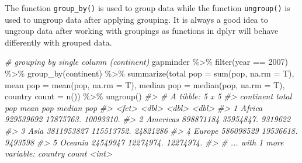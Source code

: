 \documentclass[
]{book}
\newenvironment{Shaded}{\begin{snugshade}}{\end{snugshade}}
\newcommand{\AttributeTok}[1]{\textcolor[rgb]{0.77,0.63,0.00}{#1}}
\newcommand{\CommentTok}[1]{\textcolor[rgb]{0.56,0.35,0.01}{\textit{#1}}}
\newcommand{\DecValTok}[1]{\textcolor[rgb]{0.00,0.00,0.81}{#1}}
\newcommand{\FunctionTok}[1]{\textcolor[rgb]{0.00,0.00,0.00}{#1}}
\newcommand{\NormalTok}[1]{#1}
\newcommand{\OtherTok}[1]{\textcolor[rgb]{0.56,0.35,0.01}{#1}}
\newcommand{\SpecialCharTok}[1]{\textcolor[rgb]{0.00,0.00,0.00}{#1}}
\newcommand{\StringTok}[1]{\textcolor[rgb]{0.31,0.60,0.02}{#1}}
\begin{document}
The function \texttt{group\_by()} is used to group data while the function \texttt{ungroup()} is used to ungroup data after applying grouping. It is always a good idea to ungroup data after working with groupings as functions in dplyr will behave differently with grouped data.

\begin{Shaded}
\begin{Highlighting}[]
\CommentTok{\# grouping by single column (continent)}
\NormalTok{gapminder }\SpecialCharTok{\%\textgreater{}\%}
  \FunctionTok{filter}\NormalTok{(year }\SpecialCharTok{==} \DecValTok{2007}\NormalTok{) }\SpecialCharTok{\%\textgreater{}\%}
  \FunctionTok{group\_by}\NormalTok{(continent) }\SpecialCharTok{\%\textgreater{}\%}
  \FunctionTok{summarize}\NormalTok{(}\StringTok{\textasciigrave{}}\AttributeTok{total pop}\StringTok{\textasciigrave{}} \OtherTok{=} \FunctionTok{sum}\NormalTok{(pop, }\AttributeTok{na.rm =}\NormalTok{ T), }
            \StringTok{\textasciigrave{}}\AttributeTok{mean pop}\StringTok{\textasciigrave{}} \OtherTok{=} \FunctionTok{mean}\NormalTok{(pop, }\AttributeTok{na.rm =}\NormalTok{ T), }
            \StringTok{\textasciigrave{}}\AttributeTok{median pop}\StringTok{\textasciigrave{}} \OtherTok{=} \FunctionTok{median}\NormalTok{(pop, }\AttributeTok{na.rm =}\NormalTok{ T), }
            \StringTok{\textasciigrave{}}\AttributeTok{country count}\StringTok{\textasciigrave{}} \OtherTok{=} \FunctionTok{n}\NormalTok{()) }\SpecialCharTok{\%\textgreater{}\%}
  \FunctionTok{ungroup}\NormalTok{()}
\CommentTok{\#\textgreater{} \# A tibble: 5 x 5}
\CommentTok{\#\textgreater{}   continent \textasciigrave{}total pop\textasciigrave{} \textasciigrave{}mean pop\textasciigrave{} \textasciigrave{}median pop\textasciigrave{}}
\CommentTok{\#\textgreater{}   \textless{}fct\textgreater{}           \textless{}dbl\textgreater{}      \textless{}dbl\textgreater{}        \textless{}dbl\textgreater{}}
\CommentTok{\#\textgreater{} 1 Africa      929539692  17875763.    10093310.}
\CommentTok{\#\textgreater{} 2 Americas    898871184  35954847.     9319622 }
\CommentTok{\#\textgreater{} 3 Asia       3811953827 115513752.    24821286 }
\CommentTok{\#\textgreater{} 4 Europe      586098529  19536618.     9493598 }
\CommentTok{\#\textgreater{} 5 Oceania      24549947  12274974.    12274974.}
\CommentTok{\#\textgreater{} \# ... with 1 more variable: country count \textless{}int\textgreater{}}


\end{Highlighting}
\end{Shaded}
\end{document}
